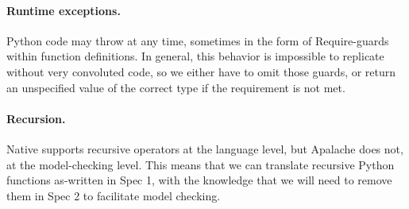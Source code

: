 \paragraph{Runtime exceptions.} Python code may throw at any time, sometimes in the form of $\mathrm{Require}$-guards within function definitions. 
In general, this behavior is impossible to replicate without very convoluted \tlap{} code, so we either have to omit those guards, or return an unspecified value of the correct type if the requirement is not met.

\paragraph{Recursion.} Native \tlap{} supports recursive operators at the language level, but Apalache does not, at the model-checking level. This means that we can translate recursive Python functions as-written in Spec 1, with the knowledge that we will need to remove them in Spec 2 to facilitate model checking.
